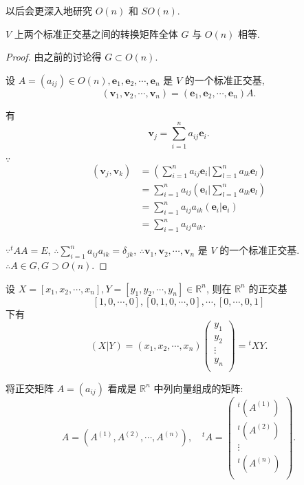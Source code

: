 \documentclass{ctexart}
\begin{document}
以后会更深入地研究 $O(n)$ 和 $SO(n)$.
\begin{theorem}[书上的定理 8]
    $V$ 上两个标准正交基之间的转换矩阵全体 $G$ 与 $O(n)$ 相等.
\end{theorem}
\begin{proof}
    由之前的讨论得 $G\subset O(n)$.

    设 $A=(a_{ij})\in O(n),\boldsymbol{e}_1,\boldsymbol{e}_2,\cdots,\boldsymbol{e}_n$ 是 $V$ 的一个标准正交基,
    \[(\boldsymbol{v}_1,\boldsymbol{v}_2,\cdots,\boldsymbol{v}_n)=(\boldsymbol{e}_1,\boldsymbol{e}_2,\cdots,\boldsymbol{e}_n)A.\]

    有
    \[\boldsymbol{v}_j=\sum\limits_{i=1}^na_{ij}\boldsymbol{e}_i.\]

    $\because$
    \begin{align*}
        (\boldsymbol{v}_j,\boldsymbol{v}_k) & =\left(\sum\limits_{i=1}^na_{ij}\boldsymbol{e}_i\bigg|\sum\limits_{l=1}^na_{lk}\boldsymbol{e}_l\right) \\
        & =\sum\limits_{i=1}^na_{ij}\left(\boldsymbol{e}_i\bigg|\sum\limits_{l=1}^na_{lk}\boldsymbol{e}_l\right) \\
        & =\sum\limits_{i=1}^na_{ij}a_{ik}\left(\boldsymbol{e}_i|\boldsymbol{e}_i\right) \\
        & =\sum\limits_{i=1}^na_{ij}a_{ik}.
    \end{align*}

    $\because{}^tAA=E$, $\therefore\sum\limits_{i=1}^na_{ij}a_{ik}=\delta_{jk}$, $\therefore\boldsymbol{v}_1,\boldsymbol{v}_2,\cdots,\boldsymbol{v}_n$ 是 $V$ 的一个标准正交基. $\therefore A\in G,G\supset O(n)$.
\end{proof}
设 $X=[x_1,x_2,\cdots,x_n],Y=[y_1,y_2,\cdots,y_n]\in\mathbb{R}^n$, 则在 $\mathbb{R}^n$ 的正交基
\[[1,0,\cdots,0],[0,1,0,\cdots,0],\cdots,[0,\cdots,0,1]\]
下有
\[(X|Y)=(x_1,x_2,\cdots,x_n)\begin{pmatrix}
    y_1 \\
    y_2 \\
    \vdots \\
    y_n \\
\end{pmatrix}={}^tXY.\]

将正交矩阵 $A=(a_{ij})$ 看成是 $\mathbb{R}^n$ 中列向量组成的矩阵:
\[A=(A^{(1)},A^{(2)},\cdots,A^{(n)}),\quad{}^tA=\begin{pmatrix}
    {}^t(A^{(1)}) \\
    {}^t(A^{(2)}) \\
    \vdots \\
    {}^t(A^{(n)}) \\
\end{pmatrix}.\]
\end{document}
